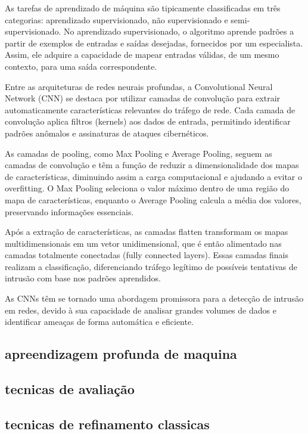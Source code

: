 \documentclass[conference]{IEEEtran}
\begin{document}
    As tarefas de aprendizado de máquina são tipicamente classificadas em três categorias: aprendizado supervisionado, não supervisionado e semi-supervisionado. No aprendizado supervisionado, o algoritmo aprende padrões a partir de exemplos de entradas e saídas desejadas, fornecidos por um especialista. Assim, ele adquire a capacidade de mapear entradas válidas, de um mesmo contexto, para uma saída correspondente.
    
    Entre as arquiteturas de redes neurais profundas, a Convolutional Neural Network (CNN) se destaca por utilizar camadas de convolução para extrair automaticamente características relevantes do tráfego de rede. Cada camada de convolução aplica filtros (kernels) aos dados de entrada, permitindo identificar padrões anômalos e assinaturas de ataques cibernéticos.

    As camadas de pooling, como Max Pooling e Average Pooling, seguem as camadas de convolução e têm a função de reduzir a dimensionalidade dos mapas de características, diminuindo assim a carga computacional e ajudando a evitar o overfitting. O Max Pooling seleciona o valor máximo dentro de uma região do mapa de características, enquanto o Average Pooling calcula a média dos valores, preservando informações essenciais.
    
    Após a extração de características, as camadas flatten transformam os mapas multidimensionais em um vetor unidimensional, que é então alimentado nas camadas totalmente conectadas (fully connected layers). Essas camadas finais realizam a classificação, diferenciando tráfego legítimo de possíveis tentativas de intrusão com base nos padrões aprendidos.
    
    As CNNs têm se tornado uma abordagem promissora para a detecção de intrusão em redes, devido à sua capacidade de analisar grandes volumes de dados e identificar ameaças de forma automática e eficiente.

\subsection{apreendizagem profunda de maquina}

\subsection{tecnicas de avaliação}

\subsection{tecnicas de refinamento classicas}
\end{document}
